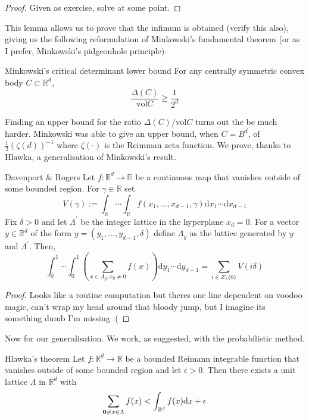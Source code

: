 \documentclass{article}
\begin{document}
\begin{proof}
    Given as exercise, solve at some point.
\end{proof}

This lemma allows us to prove that the infimum is obtained (verify this also), giving us the following reformulation
of Minkowski's fundamental theorem (or as I prefer, Minkowski's pidgeonhole principle).

\begin{theorem}[]{Minkowski's critical determinant lower bound}
    For any centrally symmetric convex body $C \subset \mathbb{R}^d$, 
    \[\frac{\Delta(C)}{\text{vol}C} \geq \frac{1}{2^d}\]
\end{theorem}

Finding an upper bound for the ratio $\Delta(C)/\text{vol}C$ turns out the be much harder. Minkowski was able to 
give an upper bound, when $C = B^d$, of $\frac{1}{2}(\zeta(d))^{-1}$ where $\zeta(\cdot)$ is the Reimman zeta function.
We prove, thanks to Hlawka, a generalisation of Minkowski's result. 

\begin{lemma}[]{Davenport $\&$ Rogers}
    Let $f:\mathbb{R}^d \to \mathbb{R}$ be a continuous map that vanishes outside of some bounded region. For $\gamma
    \in \mathbb{R}$ set \[V(\gamma) := \int_{\mathbb{R}}\cdots\int_{\mathbb{R}}f(x_1, \dots, x_{d-1}, \gamma)\mathrm{d}x_1 \cdots \mathrm{d}x_{d-1}\] 
    Fix $\delta > 0$ and let $\Lambda^\prime$ be the integer lattice in the hyperplane $x_d = 0$. For a vector $y \in \mathbb{R}^d$ 
    of the form $y = (y_1, \dots, y_{d-1}, \delta)$ define $\Lambda_y$ as the lattice generated by $y$ and $\Lambda^\prime$. 
    Then, \[\int_{0}^1 \cdots \int_{0}^1 \left(\sum_{x \in \Lambda_y, x_d \neq 0}f(x)\right)\mathrm{d}y_1 \cdots \mathrm{d}y_{d-1} 
    = \sum_{i \in Z\setminus \{0\}}V(i \delta)\]
\end{lemma}

\begin{proof}
    Looks like a routine computation but theres one line dependent on voodoo magic, can't wrap my head around that 
    bloody jump, but I imagine its something dumb I'm missing :(
\end{proof}

Now for our generalisation. We work, as suggested, with the probabilistic method. 

\begin{theorem}[]{Hlawka's theorem}
    Let $f: \mathbb{R}^d \to \mathbb{R}$ be a bounded Reimann integrable function that vanishes outside of some bounded
    region and let $\epsilon > 0$. Then there exists a unit lattice $\Lambda$ in $\mathbb{R}^d$ with 
    \[\sum_{{\bf 0} \neq x \in \Lambda}f(x) < \int_{\mathbb{R}^d}f(x)\mathrm{d}x + \epsilon\]
\end{theorem} 
\end{document}
